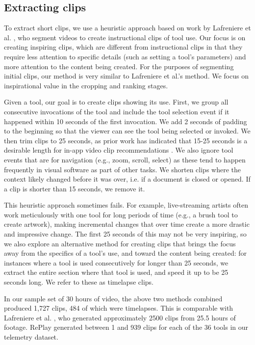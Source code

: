 \subsection{Extracting clips}
To extract short clips, we use a heuristic approach based on work by Lafreniere et al. \cite{Lafreniere2014}, who segment videos to create instructional clips of tool use. Our focus is on creating inspiring clips, which are different from instructional clips in that they require less attention to specific details (such as setting a tool's parameters) and more attention to the content being created. For the purposes of segmenting initial clips, our method is very similar to Lafreniere et al.'s method. We focus on inspirational value in the cropping and ranking stages.

Given a tool, our goal is to create clips showing its use. First, we group all consecutive invocations of the tool and include the tool selection event if it happened within 10 seconds of the first invocation. We add 2 seconds of padding to the beginning so that the viewer can see the tool being selected or invoked. We then trim clips to 25 seconds, as prior work has indicated that 15-25 seconds is a desirable length for in-app video clip recommendations \cite{Lafreniere2014}. We also ignore tool events that are for navigation (e.g., zoom, scroll, select) as these tend to happen frequently in visual software as part of other tasks. We shorten clips where the context likely changed before it was over, i.e. if a document is closed or opened. If a clip is shorter than 15 seconds, we remove it.

This heuristic approach sometimes fails. For example, live-streaming artists often work meticulously with one tool for long periods of time (e.g., a brush tool to create artwork), making incremental changes that over time create a more drastic and impressive change. The first 25 seconds of this may not be very inspiring, so we also explore an alternative method for creating clips that brings the focus away from the specifics of a tool's use, and toward the content being created: for instances where a tool is used consecutively for longer than 25 seconds, we extract the entire section where that tool is used, and speed it up to be 25 seconds long. We refer to these as timelapse clips.

In our sample set of 30 hours of video, the above two methods combined produced 1,727 clips, 484 of which were timelapses. This is comparable with Lafreniere et al. \cite{Lafreniere2014}, who generated approximately 2500 clips from 25.5 hours of footage. RePlay generated between 1 and 939 clips for each of the 36 tools in our telemetry dataset.

